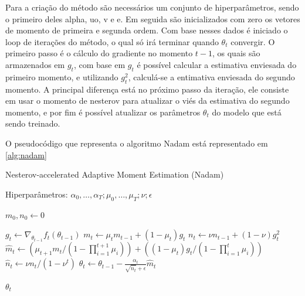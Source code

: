 Para a criação do método são necessários um conjunto de hiperparâmetros, sendo o primeiro deles alpha, uo, v e e. Em seguida são inicializados com zero os vetores de momento de primeira e segunda ordem. Com base nesses dados é iniciado o loop de iterações do método, o qual só irá terminar quando $\theta_t$ convergir. O primeiro passo é o cálculo do gradiente no momento $t-1$, os quais são armazenados em $g_t$, com base em $g_t$ é possível calcular a estimativa enviesada do primeiro momento, e utilizando $g_t^2$, calculá-se a entimativa enviesada do segundo momento. A principal diferença está no próximo passo da iteração, ele consiste em usar o momento de nesterov para atualizar o viés da estimativa do segundo momento, e por fim é possível atualizar os parâmetros $\theta_t$ do modelo que está sendo treinado.

O pseudocódigo que representa o algoritmo Nadam está representado em \ref{alg:nadam}

\begin{algorithm}[H] %
\caption{Nesterov-accelerated Adaptive Moment Estimation (Nadam)}
\label{alg:nadam}
\begin{algorithmic}[1] %

\Require Hiperparâmetros: $\alpha_0, \dots, \alpha_T; \mu_0, \dots, \mu_T; \nu; \epsilon$

\State $m_0, n_0 \leftarrow 0$ 

    \State $g_t \leftarrow \nabla_{\theta_{t-1}} f_t(\theta_{t-1})$ 
    \State $m_t \leftarrow \mu_t m_{t-1} + (1 - \mu_t) g_t$ 
    \State $n_t \leftarrow \nu n_{t-1} + (1 - \nu) g_t^2$ 
    \State $\hat{m}_t \leftarrow (\mu_{t+1} m_t / (1 - \prod_{i=1}^{t+1} \mu_i)) + ((1 - \mu_t) g_t / (1 - \prod_{i=1}^t \mu_i))$ 
    \State $\hat{n}_t \leftarrow \nu n_t / (1 - \nu^t)$ 
    \State $\theta_t \leftarrow \theta_{t-1} - \frac{\alpha_t}{\sqrt{\hat{n}_t} + \epsilon} \hat{m}_t$ 
\EndWhile

\State \Return $\theta_t$
\end{algorithmic}
\end{algorithm}

